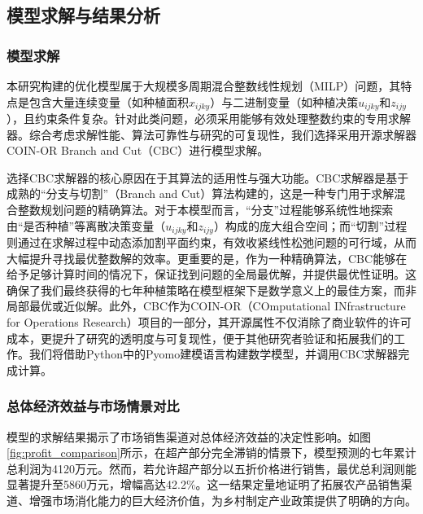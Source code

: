 \subsection{模型求解与结果分析}

\subsubsection{模型求解}

本研究构建的优化模型属于大规模多周期混合整数线性规划（MILP）问题，其特点是包含大量连续变量（如种植面积$x_{ijky}$）与二进制变量（如种植决策$u_{ijky}$和$z_{ijy}$），且约束条件复杂。针对此类问题，必须采用能够有效处理整数约束的专用求解器。综合考虑求解性能、算法可靠性与研究的可复现性，我们选择采用开源求解器COIN-OR Branch and Cut（CBC）进行模型求解。

选择CBC求解器的核心原因在于其算法的适用性与强大功能。CBC求解器是基于成熟的“分支与切割”（Branch and Cut）算法构建的，这是一种专门用于求解混合整数规划问题的精确算法。对于本模型而言，“分支”过程能够系统性地探索由“是否种植”等离散决策变量（$u_{ijky}$和$z_{ijy}$）构成的庞大组合空间；而“切割”过程则通过在求解过程中动态添加割平面约束，有效收紧线性松弛问题的可行域，从而大幅提升寻找最优整数解的效率。更重要的是，作为一种精确算法，CBC能够在给予足够计算时间的情况下，保证找到问题的全局最优解，并提供最优性证明。这确保了我们最终获得的七年种植策略在模型框架下是数学意义上的最佳方案，而非局部最优或近似解。此外，CBC作为COIN-OR（COmputational INfrastructure for Operations Research）项目的一部分，其开源属性不仅消除了商业软件的许可成本，更提升了研究的透明度与可复现性，便于其他研究者验证和拓展我们的工作。我们将借助Python中的Pyomo建模语言构建数学模型，并调用CBC求解器完成计算。

\subsubsection{总体经济效益与市场情景对比}

模型的求解结果揭示了市场销售渠道对总体经济效益的决定性影响。如图\ref{fig:profit_comparison}所示，在超产部分完全滞销的情景下，模型预测的七年累计总利润为4120万元。然而，若允许超产部分以五折价格进行销售，最优总利润则能显著提升至5860万元，增幅高达42.2\%。这一结果定量地证明了拓展农产品销售渠道、增强市场消化能力的巨大经济价值，为乡村制定产业政策提供了明确的方向。


